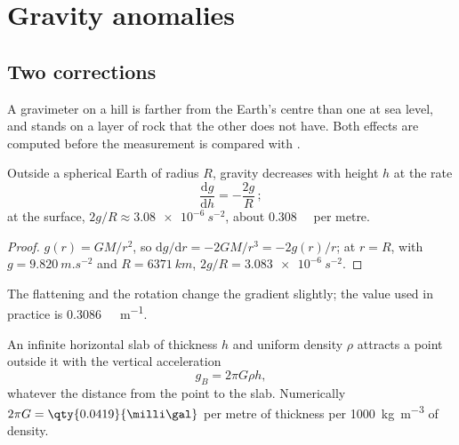 \section{Gravity anomalies}

\subsection*{Two corrections}

A gravimeter on a hill is farther from the Earth's centre than one at sea level,
and stands on a layer of rock that the other does not have. Both effects are
computed before the measurement is compared with .

\begin{proposition}\label{prop:b1:isostasy-gravity:free-air}
Outside a spherical Earth of radius $R$, gravity decreases with height $h$ at
the rate
\[
  \frac{\mathrm dg}{\mathrm dh} = -\frac{2g}{R}\,;
\]
at the surface, $2g/R \approx \qty{3.08e-6}{s^{-2}}$, about
\qty{0.308}{\milli\gal} per metre.
\end{proposition}

\begin{proof}
$g(r) = GM/r^2$, so $\mathrm dg/\mathrm dr = -2GM/r^3 = -2g(r)/r$; at $r = R$,
with $g = \qty{9.820}{m.s^{-2}}$ and $R = \qty{6371}{km}$, $2g/R =
\qty{3.083e-6}{s^{-2}}$.
\end{proof}

The flattening and the rotation change the gradient slightly; the value used in
practice is \qty{0.3086}{\milli\gal.m^{-1}}.

\begin{proposition}\label{prop:b1:isostasy-gravity:slab}
An infinite horizontal slab of thickness $h$ and uniform density $\rho$ attracts
a point outside it with the vertical acceleration
\[
  g_B = 2\pi G\rho h ,
\]
whatever the distance from the point to the slab. Numerically $2\pi G =
\qty{0.0419}{\milli\gal}$ per metre of thickness per \qty{1000}{kg.m^{-3}} of
density.
\end{proposition}

